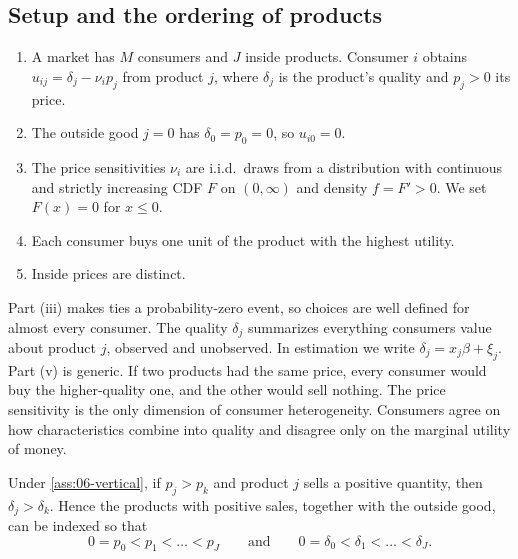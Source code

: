 \subsection{Setup and the ordering of products}\label{sec:06-vsetup}

\begin{assumption}\label{ass:06-vertical}
\leavevmode
\begin{enumerate}[label=(\roman*)]
  \item A market has $M$ consumers and $J$ inside products. Consumer $i$ obtains $u_{ij} = \delta_j - \nu_i p_j$
        from product $j$, where $\delta_j$ is the product's quality and $p_j > 0$ its price.
  \item The outside good $j = 0$ has $\delta_0 = p_0 = 0$, so $u_{i0} = 0$.
  \item The price sensitivities $\nu_i$ are i.i.d.\ draws from a distribution with continuous and strictly
        increasing CDF $F$ on $(0,\infty)$ and density $f = F' > 0$. We set $F(x) = 0$ for $x \le 0$.
  \item Each consumer buys one unit of the product with the highest utility.
  \item Inside prices are distinct.
\end{enumerate}
\end{assumption}

Part (iii) makes ties a probability-zero event, so choices are well defined for almost every consumer. The
quality $\delta_j$ summarizes everything consumers value about product $j$, observed and unobserved. In
estimation we write $\delta_j = x_j\beta + \xi_j$. Part (v) is generic. If two products had the same price,
every consumer would buy the higher-quality one, and the other would sell nothing. The price sensitivity
is the only dimension of consumer heterogeneity. Consumers agree on how characteristics combine into
quality and disagree only on the marginal utility of money.

\begin{lemma}[Ordering]\label{lem:06-ordering}
Under \cref{ass:06-vertical}, if $p_j > p_k$ and product $j$ sells a positive quantity, then
$\delta_j > \delta_k$. Hence the products with positive sales, together with the outside good, can be
indexed so that
\begin{equation}\label{eq:06-ordering}
  0 = p_0 < p_1 < \dots < p_J \qquad\text{and}\qquad 0 = \delta_0 < \delta_1 < \dots < \delta_J .
\end{equation}
\end{lemma}

